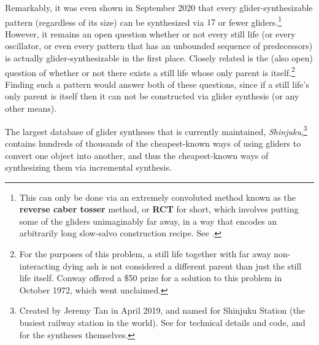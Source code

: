 Remarkably, it was even shown in September 2020 that every glider-synthesizable pattern (regardless of its size) can be synthesized via $17$ or fewer gliders.\footnote{This can only be done via an extremely convoluted method known as the \textbf{reverse caber tosser} method, or \textbf{RCT} for short, which involves putting some of the gliders unimaginably far away, in a way that encodes an arbitrarily long slow-salvo construction recipe. See .} However, it remains an open question whether or not every still life (or every oscillator, or even every pattern that has an unbounded sequence of predecessors) is actually glider-synthesizable in the first place. Closely related is the (also open) question of whether or not there exists a still life whose only parent is itself.\footnote{For the purposes of this problem, a still life together with far away non-interacting dying ash is not considered a different parent than just the still life itself. Conway offered a \$50 prize for a solution to this problem in October 1972, which went unclaimed.} Finding such a pattern would answer both of these questions, since if a still life's only parent is itself then it can not be constructed via glider synthesis (or any other means).

The largest database of glider syntheses that is currently maintained, \emph{Shinjuku},\footnote{Created by Jeremy Tan in April 2019, and named for Shinjuku Station (the busiest railway station in the world). See  for technical details and code, and  for the syntheses themselves.} contains hundreds of thousands of the cheapest-known ways of using gliders to convert one object into another, and thus the cheapest-known ways of synthesizing them via incremental synthesis.

